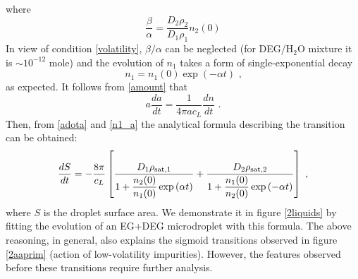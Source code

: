 \documentclass[twoside,twocolumn,9pt]{article}
\begin{document}
where
\begin{equation*}
\frac{\beta}{\alpha} = \frac{D_2\rho_2}{D_1\rho_1} n_{2}(0)
\end{equation*}
In view of condition \ref{volatility}, $\beta / \alpha$ can be neglected (for DEG/H$_2$O mixture it is $\sim 10^{-12}$ mole) and the evolution of $n_1$ takes a form of single-exponential decay
\begin{equation}
n_1 =  n_{1}(0) \exp \left( -\alpha t \right) \mbox{~,}
\label{decay}
\end{equation}
as expected. It follows from \ref{amount} that
\begin{equation}
a\frac{da}{dt} = \frac{1}{4\pi ac_L} \frac{dn}{dt}  \mbox{~.}
\label{adota}
\end{equation}
Then, from \ref{adota} and \ref{n1_a} the analytical formula describing the transition can be obtained:
\begin{equation}
\frac{dS}{dt} = -\frac{8\pi}{c_L} \left[ \frac{D_1\rho_{{\rm sat},1}}{1+\dfrac{n_{2}(0)}{n_{1}(0)}\exp\left(\alpha t\right)} + \dfrac{D_2\rho_{{\rm sat},2}}{1+\dfrac{n_{1}(0)}{n_{2}(0)}\exp\left(-\alpha t\right)} \right] \mbox{~,}
\label{sigmoidal}
\end{equation}
where $S$ is the droplet surface area. We demonstrate it in figure \ref{2liquids} by fitting the evolution of an EG+DEG microdroplet with this formula. The above reasoning, in general, also explains the sigmoid transitions observed in figure \ref{2aaprim} (action of low-volatility impurities). However, the features observed before these transitions require further analysis.
\end{document}
